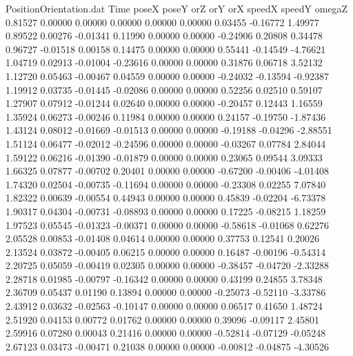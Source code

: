 \begin{filecontents}{PositionOrientation.dat}
Time poseX poseY orZ orY orX speedX speedY omegaZ
   0.81527    0.00000    0.00000     0.00000    0.00000    0.00000    0.03455   -0.16772    1.49977
   0.89522    0.00276   -0.01341     0.11990    0.00000    0.00000   -0.24906    0.20808    0.34478
   0.96727   -0.01518    0.00158     0.14475    0.00000    0.00000    0.55441   -0.14549   -4.76621
   1.04719    0.02913   -0.01004    -0.23616    0.00000    0.00000    0.31876    0.06718    3.52132
   1.12720    0.05463   -0.00467     0.04559    0.00000    0.00000   -0.24032   -0.13594   -0.92387
   1.19912    0.03735   -0.01445    -0.02086    0.00000    0.00000    0.52256    0.02510    0.59107
   1.27907    0.07912   -0.01244     0.02640    0.00000    0.00000   -0.20457    0.12443    1.16559
   1.35924    0.06273   -0.00246     0.11984    0.00000    0.00000    0.24157   -0.19750   -1.87436
   1.43124    0.08012   -0.01669    -0.01513    0.00000    0.00000   -0.19188   -0.04296   -2.88551
   1.51124    0.06477   -0.02012    -0.24596    0.00000    0.00000   -0.03267    0.07784    2.84044
   1.59122    0.06216   -0.01390    -0.01879    0.00000    0.00000    0.23065    0.09544    3.09333
   1.66325    0.07877   -0.00702     0.20401    0.00000    0.00000   -0.67200   -0.00406   -4.01408
   1.74320    0.02504   -0.00735    -0.11694    0.00000    0.00000   -0.23308    0.02255    7.07840
   1.82322    0.00639   -0.00554     0.44943    0.00000    0.00000    0.45839   -0.02204   -6.73378
   1.90317    0.04304   -0.00731    -0.08893    0.00000    0.00000    0.17225   -0.08215    1.18259
   1.97523    0.05545   -0.01323    -0.00371    0.00000    0.00000   -0.58618   -0.01068    0.62276
   2.05528    0.00853   -0.01408     0.04614    0.00000    0.00000    0.37753    0.12541    0.20026
   2.13524    0.03872   -0.00405     0.06215    0.00000    0.00000    0.16487   -0.00196   -0.54314
   2.20725    0.05059   -0.00419     0.02305    0.00000    0.00000   -0.38457   -0.04720   -2.33288
   2.28718    0.01985   -0.00797    -0.16342    0.00000    0.00000    0.43199    0.24855    3.78348
   2.36709    0.05437    0.01190     0.13894    0.00000    0.00000   -0.25073   -0.52110   -3.33786
   2.43912    0.03632   -0.02563    -0.10147    0.00000    0.00000    0.06517    0.41650    1.48724
   2.51920    0.04153    0.00772     0.01762    0.00000    0.00000    0.39096   -0.09117    2.45801
   2.59916    0.07280    0.00043     0.21416    0.00000    0.00000   -0.52814   -0.07129   -0.05248
   2.67123    0.03473   -0.00471     0.21038    0.00000    0.00000   -0.00812   -0.04875   -4.30526

\end{filecontents}
